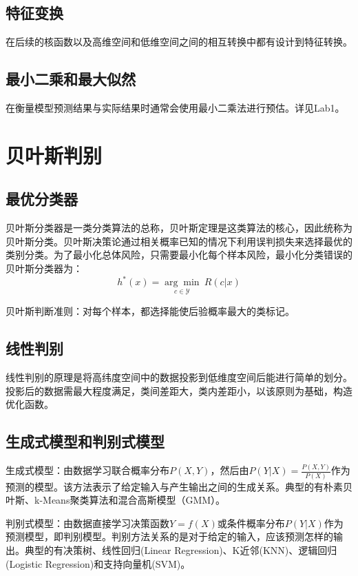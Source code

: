 \documentclass[12pt]{article}
\begin{document}
\subsection{特征变换}
在后续的核函数以及高维空间和低维空间之间的相互转换中都有设计到特征转换。
\subsection{最小二乘和最大似然}
在衡量模型预测结果与实际结果时通常会使用最小二乘法进行预估。详见Lab1。 
\section{贝叶斯判别}
\subsection{最优分类器}
贝叶斯分类器是一类分类算法的总称，贝叶斯定理是这类算法的核心，因此统称为贝叶斯分类。贝叶斯决策论通过相关概率已知的情况下利用误判损失来选择最优的类别分类。为了最小化总体风险，只需要最小化每个样本风险，最小化分类错误的贝叶斯分类器为：
\[h^*(x)=\underset{c\in \mathcal{Y} }{\arg \min}\ R(c|x)\]\par
贝叶斯判断准则：对每个样本，都选择能使后验概率最大的类标记。
\subsection{线性判别}
线性判别的原理是将高纬度空间中的数据投影到低维度空间后能进行简单的划分。投影后的数据需最大程度满足，类间差距大，类内差距小，以该原则为基础，构造优化函数。
\subsection{生成式模型和判别式模型}
生成式模型：由数据学习联合概率分布$P(X,Y)$，然后由$P(Y|X)=\frac{P(X,Y)}{P(X)}$作为预测的模型。该方法表示了给定输入与产生输出之间的生成关系。典型的有朴素贝叶斯、k-Means聚类算法和混合高斯模型（GMM）。\par
判别式模型：由数据直接学习决策函数$Y=f(X)$或条件概率分布$P(Y|X)$作为预测模型，即判别模型。判别方法关系的是对于给定的输入，应该预测怎样的输出。典型的有决策树、线性回归(Linear Regression)、K近邻(KNN)、逻辑回归(Logistic Regression)和支持向量机(SVM)。
\end{document}
